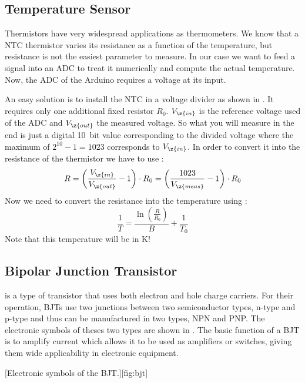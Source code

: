 \subsection{Temperature Sensor}
Thermistors have very widespread applications as thermometers. We know that a \ac{NTC} thermistor varies its resistance as a function of the temperature, but resistance is not the easiest parameter to measure. In our case we want to feed a signal into an \ac{ADC} to treat it numerically and compute the actual temperature. Now, the \ac{ADC} of the Arduino requires a voltage at its input.\par
%
An easy solution is to install the \ac{NTC} in a voltage divider as shown in . It requires only one additional fixed resistor $R_{0}$. $V_{\z{in}}$ is the reference voltage used of the \ac{ADC} and $V_{\z{out}}$ the measured voltage. So what you will measure in the end is just a digital \SI{10}{bit} value corresponding to the divided voltage where the maximum of $2^{10} - 1= 1023$ corresponds to $V_{\z{in}}$. In order to convert it into the resistance of the thermistor we have to use :
%
\begin{equation}
  R = \left(\frac{V_{\z{in}}}{V_{\z{out}}} - 1\right)\cdot R_{0} = \left(\frac{1023}{V_{\z{meas}}} - 1\right)\cdot R_{0}
\end{equation}
%
Now we need to convert the resistance into the temperature using :
%
\begin{equation}
  \frac{1}{T} = \frac{\ln\left(\frac{R}{R_{0}}\right)}{B} + \frac{1}{T_{0}} 
\end{equation}
%
Note that this temperature will be in \si{\kelvin}!
%
\subsection{Bipolar Junction Transistor}\label{sec:trans}
 is a type of transistor that uses both electron and hole charge carriers. For their operation, \acp{BJT} use two junctions between two semiconductor types, n-type and p-type and thus can be manufactured in two types, NPN and PNP. The electronic symbols of theses two types are shown in . The basic function of a \ac{BJT} is to amplify current which allows it to be used as amplifiers or switches, giving them wide applicability in electronic equipment.\par
%
[Electronic symbols of the \ac{BJT}.][fig:bjt]
%
